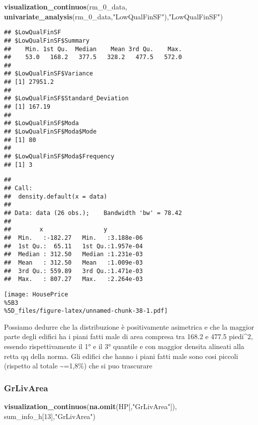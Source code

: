 \documentclass[
]{article}
\newenvironment{Shaded}{\begin{snugshade}}{\end{snugshade}}
\newcommand{\DecValTok}[1]{\textcolor[rgb]{0.00,0.00,0.81}{#1}}
\newcommand{\FunctionTok}[1]{\textcolor[rgb]{0.13,0.29,0.53}{\textbf{#1}}}
\newcommand{\NormalTok}[1]{#1}
\newcommand{\StringTok}[1]{\textcolor[rgb]{0.31,0.60,0.02}{#1}}
\begin{document}
\begin{Shaded}
\begin{Highlighting}[]
\FunctionTok{visualization\_continuos}\NormalTok{(rm\_0\_data, }\FunctionTok{univariate\_analysis}\NormalTok{(rm\_0\_data,}\StringTok{"LowQualFinSF"}\NormalTok{),}\StringTok{"LowQualFinSF"}\NormalTok{)}
\end{Highlighting}
\end{Shaded}

\begin{verbatim}
## $LowQualFinSF
## $LowQualFinSF$Summary
##    Min. 1st Qu.  Median    Mean 3rd Qu.    Max. 
##    53.0   168.2   377.5   328.2   477.5   572.0 
## 
## $LowQualFinSF$Variance
## [1] 27951.2
## 
## $LowQualFinSF$Standard_Deviation
## [1] 167.19
## 
## $LowQualFinSF$Moda
## $LowQualFinSF$Moda$Mode
## [1] 80
## 
## $LowQualFinSF$Moda$Frequency
## [1] 3
\end{verbatim}

\begin{verbatim}
## 
## Call:
##  density.default(x = data)
## 
## Data: data (26 obs.);    Bandwidth 'bw' = 78.42
## 
##        x                 y            
##  Min.   :-182.27   Min.   :3.188e-06  
##  1st Qu.:  65.11   1st Qu.:1.957e-04  
##  Median : 312.50   Median :1.231e-03  
##  Mean   : 312.50   Mean   :1.009e-03  
##  3rd Qu.: 559.89   3rd Qu.:1.471e-03  
##  Max.   : 807.27   Max.   :2.264e-03
\end{verbatim}

\texttt{[image: HousePrice\\\%5B3\\\%5D\_files/figure-latex/unnamed-chunk-38-1.pdf]}

Possiamo dedurre che la distribuzione è positivamente asimetrica e che
la maggior parte degli edifici ha i piani fatti male di area compresa
tra 168.2 e 477.5 piedi\^{}2, essendo rispettivamente il 1° e il 3°
quantile e con maggior densita alineati alla retta qq della norma. Gli
edifici che hanno i piani fatti male sono cosi piccoli (rispetto al
totale \textasciitilde=1,8\%) che si puo trascurare

\subsubsection{GrLivArea}\label{grlivarea}

\begin{Shaded}
\begin{Highlighting}[]
\FunctionTok{visualization\_continuos}\NormalTok{(}\FunctionTok{na.omit}\NormalTok{(HP[,}\StringTok{"GrLivArea"}\NormalTok{]), sum\_info\_h[}\DecValTok{13}\NormalTok{],}\StringTok{"GrLivArea"}\NormalTok{)}
\end{Highlighting}
\end{Shaded}
\end{document}
